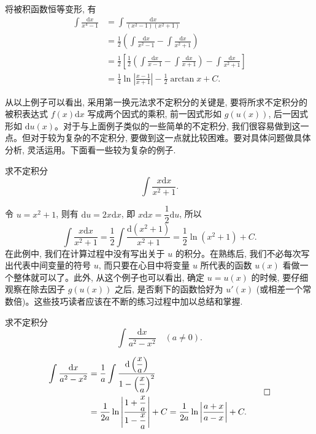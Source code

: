 \begin{solve}
将被积函数恒等变形, 有
\[
\begin{aligned}
  \int\frac{\mathrm dx}{x^4-1}
  &=
  \int\frac{\mathrm dx}{(x^2-1)(x^2+1)}\\
  &=
  \frac12\left(\int\frac{\mathrm dx}{x^2-1}-\int\frac{\mathrm dx}{x^2+1}\right)\\
  &=
  \frac12\left[\frac12\left(\int\frac{\mathrm dx}{x-1}-\int\frac{\mathrm dx}{x+1}\right)
  -\int\frac{\mathrm dx}{x^2+1}\right]\\
  &=
  \frac14\ln\left|\frac{x-1}{x+1}\right|-\frac12\arctan x+C.
\end{aligned}
\]

从以上例子可以看出, 采用第一换元法求不定积分的关键是, 要将所求不定积分的被积表达式 $f(x)\mathrm dx$ 写成两个因式的乘积, 前一因式形如 $g(u(x))$, 后一因式形如 $\mathrm du(x)$。对于与上面例子类似的一些简单的不定积分, 我们很容易做到这一点。但对于较为复杂的不定积分, 要做到这一点就比较困难。要对具体问题做具体分析, 灵活运用。下面看一些较为复杂的例子.
\end{solve}


\begin{example}\label{example:ma-6-2-6}
求不定积分
\[
  \int\frac{x\mathrm dx}{x^2+1}.
\]
\end{example}


\begin{solve}
令 $u=x^2+1$, 则有 $\mathrm du=2x\mathrm dx$, 即 $x\mathrm dx=\dfrac12\mathrm du$, 所以
\[
  \int\frac{x\mathrm dx}{x^2+1}
  =
  \frac12\int\frac{\mathrm d(x^2+1)}{x^2+1}
  =
  \frac12\ln(x^2+1)+C.
\]
在此例中, 我们在计算过程中没有写出关于 $u$ 的积分。在熟练后, 我们不必每次写出代表中间变量的符号 $u$, 而只要在心目中将变量 $u$ 所代表的函数 $u(x)$ 看做一个整体就可以了。此外, 从这个例子也可以看出, 确定 $u=u(x)$ 的时候, 要仔细观察在除去因子 $g(u(x))$ 之后, 是否剩下的函数恰好为 $u'(x)$ (或相差一个常数倍)。这些技巧读者应该在不断的练习过程中加以总结和掌握.
\end{solve}


\begin{example}\label{example:ma-6-2-7}
求不定积分
\[
  \int\frac{\mathrm dx}{a^2-x^2}\quad (a\ne0).
\]
\end{example}


\begin{solve}[{解法 1}]
\[
\begin{aligned}
  \int\frac{\mathrm dx}{a^2-x^2}
  &=
  \frac1a\int\frac{\mathrm d\left(\dfrac xa\right)}{1-\left(\dfrac xa\right)^2}\\
  &=
  \frac1{2a}\ln\left|\frac{1+\dfrac xa}{1-\dfrac xa}\right|+C
  =
  \frac1{2a}\ln\left|\frac{a+x}{a-x}\right|+C.
\end{aligned}
\qedhere
\]
\end{solve}



